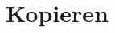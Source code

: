 \documentclass[a4paper,11pt]{article}
\newcommand{\anf}[1]{»#1«}
\newcommand{\inanf}[1]{›#1‹}
\begin{document}
\begin{comment}

 
Für die Coda:
 
Was liegt nun näher als diese abgründige Geschichte über die \anf{Verzweigung in der Zeit}\footcite[169]{borges:1941} als eine Art literarische Präfiguration der informatischen Versionskontrolle einzuordnen. Ja, sicher. 

Borges und die unterschiedlichen Zeitebenen, die in der Fiktion sich anbieten... Dies in Analogie zu unterschiedlichen Entwicklungszeiten bei der Softwareproduktion. 


Alternative Entwürfe sichern

Überblick bewahren. Version und Kontrolle. Diese Eigenschaften sind freilich auch bei der klassischen, das heisst philologischen Edition von Texten erforderlich. \anf{Ich habe Hunderte von Handschriften miteinander verglichen, habe die Fehler korrigiert, die sich durch die Nachlässigkeit der Abschreiber eingeschlichen haben; ich habe den Plan dieses Chaos erschossen, habe die ursprüngliche Ordnung wieder hergestellt}.\footcite[172]{borges:1941}

	***

Joethes Delegationen

Ein weiterer Aspekt
Verzweigen als Delegieren [Dies seinerseits als Abzweigung kennzeichnen...]
Goethes Verzweigungen: Seine lahme Tintenhand.

Sieben: 185–197.

Einbauen: 
"Alle Subalternen nehmen in spezifischer Weise eine Eigenart an, die sie ihrem Herrn und Gebieter ähnlicher werden läßt. Johann Georg Paul Götze, der rund 17 Jahre bei Goethen dient, gelingt es beispielsweise,...Der Meister dupliziert sich in seinen Domestiken."

	***


Siehe auch Schlagwort \inanf{Verzweigung} in Synapsen...

\end{comment}


\section{Kopieren}
\end{document}
